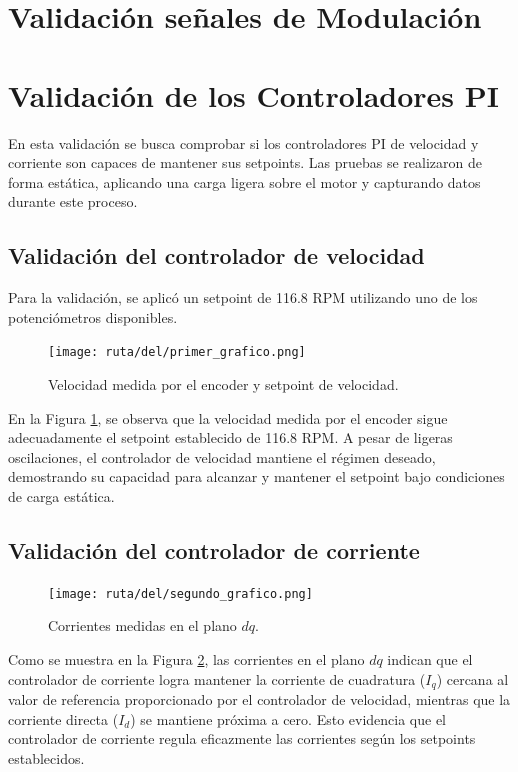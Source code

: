\documentclass[11pt]{report}
\begin{document}
\section{Validación señales de Modulación}

\newpage
\section{Validación de los Controladores PI}
En esta validación se busca comprobar si los controladores PI de velocidad y corriente son capaces de mantener sus setpoints. Las pruebas se realizaron de forma estática, aplicando una carga ligera sobre el motor y capturando datos durante este proceso.

\subsection{Validación del controlador de velocidad}
Para la validación, se aplicó un setpoint de 116.8 RPM utilizando uno de los potenciómetros disponibles.

\begin{figure}[ht]
	\centering
	\texttt{[image: ruta/del/primer\_grafico.png]}
	\caption{Velocidad medida por el encoder y setpoint de velocidad.}
	\label{velocidad_encoder}
\end{figure}
\FloatBarrier

En la Figura \ref{velocidad_encoder}, se observa que la velocidad medida por el encoder sigue adecuadamente el setpoint establecido de 116.8 RPM. A pesar de ligeras oscilaciones, el controlador de velocidad mantiene el régimen deseado, demostrando su capacidad para alcanzar y mantener el setpoint bajo condiciones de carga estática.

\subsection{Validación del controlador de corriente}

\begin{figure}[ht]
	\centering
	\texttt{[image: ruta/del/segundo\_grafico.png]}
	\caption{Corrientes medidas en el plano $dq$.}
	\label{corrientes_dq}
\end{figure}
\FloatBarrier

Como se muestra en la Figura \ref{corrientes_dq}, las corrientes en el plano $dq$ indican que el controlador de corriente logra mantener la corriente de cuadratura ($I_q$) cercana al valor de referencia proporcionado por el controlador de velocidad, mientras que la corriente directa ($I_d$) se mantiene próxima a cero. Esto evidencia que el controlador de corriente regula eficazmente las corrientes según los setpoints establecidos.
\end{document}
